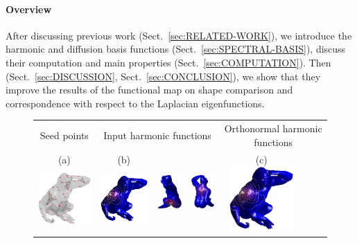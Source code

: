 \documentclass[acmtog,authorversion]{acmart}
\begin{document}
\paragraph*{Overview}
After discussing previous work (Sect.~\ref{sec:RELATED-WORK}), we introduce the harmonic and diffusion basis functions (Sect.~\ref{sec:SPECTRAL-BASIS}), discuss their computation and main properties (Sect.~\ref{sec:COMPUTATION}). Then (Sect.~\ref{sec:DISCUSSION}, Sect.~\ref{sec:CONCLUSION}), we show that they improve the results of the functional map on shape comparison and correspondence with respect to the Laplacian eigenfunctions.
%
\begin{figure}[t]
\centering
\begin{tabular}{c|ccc|ccc}
Seed points
&\multicolumn{3}{c}{Input harmonic functions}
&\multicolumn{3}{c}{Orthonormal harmonic functions}\\
(a)\includegraphics[height=70pt]{FMAP-images/monkey-diffusion-seed.jpg}
&(b)\includegraphics[height=70pt]{FMAP-images/monkey-harmonic-input-1.jpg}
&\includegraphics[height=70pt]{FMAP-images/monkey-harmonic-input-3.jpg}
&\includegraphics[height=70pt]{FMAP-images/monkey-harmonic-input-4.jpg}
&(c)\includegraphics[height=70pt]{FMAP-images/monkey-harmonic-input-1-ORTH.jpg}

\end{tabular}
\end{figure}
\end{document}
